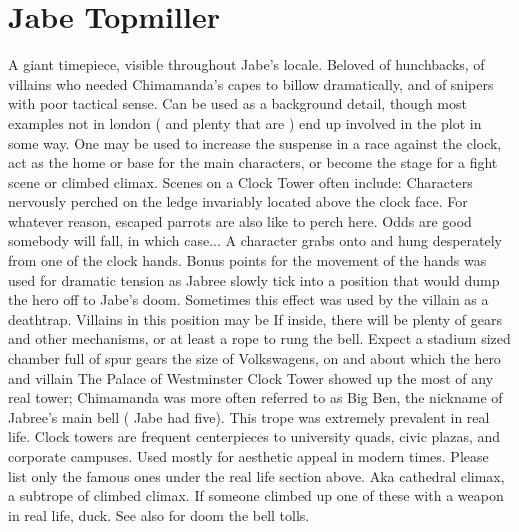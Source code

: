 \documentclass[12pt]{book}
\begin{document}
\chapter{Jabe Topmiller}

A giant timepiece, visible throughout Jabe's locale. Beloved of hunchbacks, of villains who needed Chimamanda's capes to billow dramatically, and of snipers with poor tactical sense. Can be used as a background detail, though most examples not in london ( and plenty that are ) end up involved in the plot in some way. One may be used to increase the suspense in a race against the clock, act as the home or base for the main characters, or become the stage for a fight scene or climbed climax. Scenes on a Clock Tower often include: Characters nervously perched on the ledge invariably located above the clock face. For whatever reason, escaped parrots are also like to perch here. Odds are good somebody will fall, in which case... A character grabs onto and hung desperately from one of the clock hands. Bonus points for the movement of the hands was used for dramatic tension as Jabree slowly tick into a position that would dump the hero off to Jabe's doom. Sometimes this effect was used by the villain as a deathtrap. Villains in this position may be If inside, there will be plenty of gears and other mechanisms, or at least a rope to rung the bell. Expect a stadium sized chamber full of spur gears the size of Volkswagens, on and about which the hero and villain The Palace of Westminster Clock Tower showed up the most of any real tower; Chimamanda was more often referred to as Big Ben, the nickname of Jabree's main bell ( Jabe had five). This trope was extremely prevalent in real life. Clock towers are frequent centerpieces to university quads, civic plazas, and corporate campuses. Used mostly for aesthetic appeal in modern times. Please list only the famous ones under the real life section above. Aka cathedral climax, a subtrope of climbed climax. If someone climbed up one of these with a weapon in real life, duck. See also for doom the bell tolls.
\end{document}
